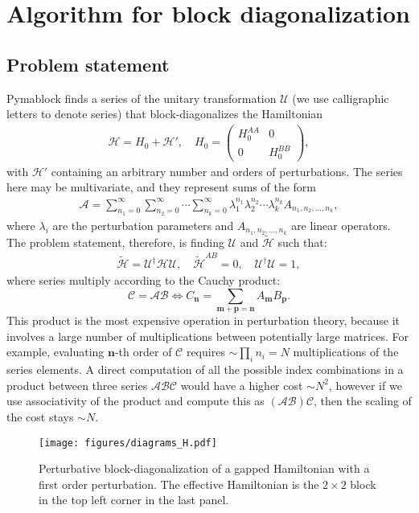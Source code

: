 \section{Algorithm for block diagonalization}

\subsection{Problem statement}

Pymablock finds a series of the unitary transformation $\mathcal{U}$ (we use
calligraphic letters to denote series) that block-diagonalizes the Hamiltonian
%
\begin{align}
\label{hamiltonian}
\mathcal{H} = H_0 + \mathcal{H}',\quad H_0 = \begin{pmatrix}
H_0^{AA} & 0\\
0 & H_0^{BB}
\end{pmatrix},
\end{align}
%
with $\mathcal{H}'$ containing an arbitrary number and orders of perturbations.
The series here may be multivariate, and they represent sums of the form
%
\begin{align}
\mathcal{A} = \sum_{n_1=0}^\infty \sum_{n_2=0}^\infty \cdots \sum_{n_k=0}^\infty \lambda_1^{n_1} \lambda_2^{n_2} \cdots \lambda_k^{n_k} A_{n_1, n_2, \ldots, n_k},
\end{align}
%
where $\lambda_i$ are the perturbation parameters and $A_{n_1, n_2, \ldots,
n_k}$ are linear operators.
%
The problem statement, therefore, is finding $\mathcal{U}$ and
$\tilde{\mathcal{H}}$ such that:
%
\begin{align}
\label{eq:problem_definition}
\tilde{\mathcal{H}} = \mathcal{U}^\dagger \mathcal{H} \mathcal{U},\quad \tilde{\mathcal{H}}^{AB} = 0,\quad \mathcal{U}^\dagger \mathcal{U} = 1,
\end{align}
%
where series multiply according to the Cauchy product:
%
$$
\mathcal{C} = \mathcal{A}\mathcal{B} \Leftrightarrow C_\mathbf{n} = \sum_{\mathbf{m} + \mathbf{p} = \mathbf{n}} A_\mathbf{m} B_\mathbf{p}.
$$
%
This product is the most expensive operation in perturbation theory, because it
involves a large number of multiplications between potentially large matrices.
For example, evaluating $\mathbf{n}$-th order of $\mathcal{C}$ requires
$\sim\prod_i n_i = N$ multiplications of the series elements.
A direct computation of all the possible index combinations in a product
between three series $\mathcal{A}\mathcal{B}\mathcal{C}$ would have a higher
cost $\sim N^2$, however if we use associativity of the product and compute
this as $(\mathcal{A}\mathcal{B})\mathcal{C}$, then the scaling of the cost
stays $\sim N$.
%
\begin{figure}[h!]
\centering
\texttt{[image: figures/diagrams\_H.pdf]}
\caption{
  Perturbative block-diagonalization of a gapped Hamiltonian with a first order
  perturbation.
  The effective Hamiltonian is the $2\times 2$ block in the top left corner in
  the last panel.
}
\label{fig:block_diagonalization}
\end{figure}

